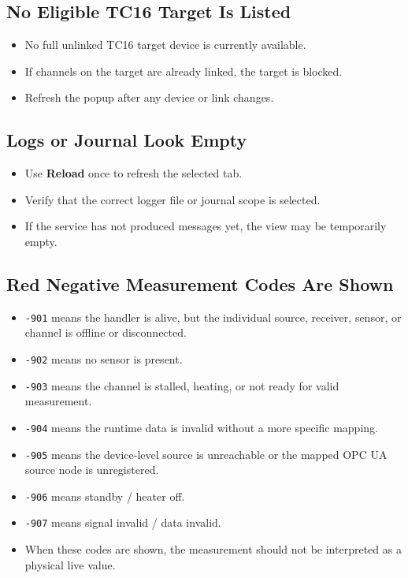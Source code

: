 \documentclass[11pt,a4paper]{article}
\begin{document}
\subsection{No Eligible TC16 Target Is Listed}
\begin{itemize}
\item No full unlinked TC16 target device is currently available.
\item If channels on the target are already linked, the target is blocked.
\item Refresh the popup after any device or link changes.
\end{itemize}

\subsection{Logs or Journal Look Empty}
\begin{itemize}
\item Use \textbf{Reload} once to refresh the selected tab.
\item Verify that the correct logger file or journal scope is selected.
\item If the service has not produced messages yet, the view may be temporarily empty.
\end{itemize}

\subsection{Red Negative Measurement Codes Are Shown}
\begin{itemize}
\item \texttt{-901} means the handler is alive, but the individual source, receiver, sensor, or channel is offline or disconnected.
\item \texttt{-902} means no sensor is present.
\item \texttt{-903} means the channel is stalled, heating, or not ready for valid measurement.
\item \texttt{-904} means the runtime data is invalid without a more specific mapping.
\item \texttt{-905} means the device-level source is unreachable or the mapped OPC UA source node is unregistered.
\item \texttt{-906} means standby / heater off.
\item \texttt{-907} means signal invalid / data invalid.
\item When these codes are shown, the measurement should not be interpreted as a physical live value.
\end{itemize}
\end{document}
